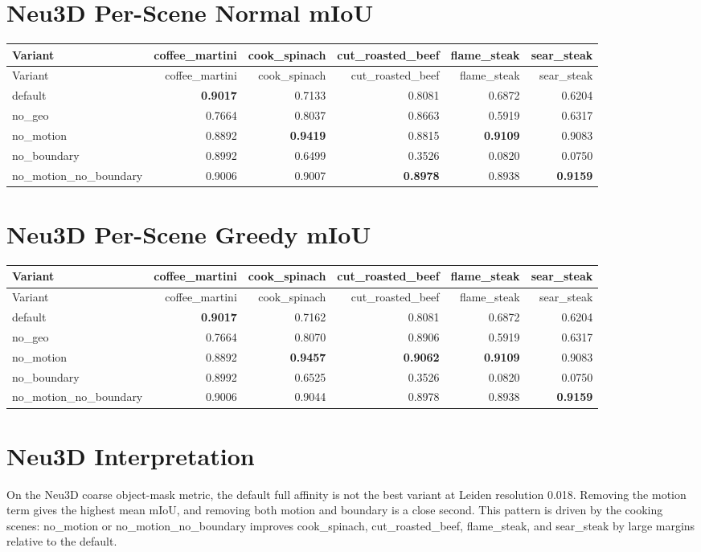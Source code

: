 \documentclass[10pt]{article}
\begin{document}
\section{Neu3D Per-Scene Normal mIoU}
\small
\begin{longtable}{lrrrrr}
\toprule
Variant & coffee\_martini & cook\_spinach & cut\_roasted\_beef & flame\_steak & sear\_steak \\
\midrule
\endfirsthead
\toprule
Variant & coffee\_martini & cook\_spinach & cut\_roasted\_beef & flame\_steak & sear\_steak \\
\midrule
\endhead
default & \textbf{0.9017} & 0.7133 & 0.8081 & 0.6872 & 0.6204 \\
no\_geo & 0.7664 & 0.8037 & 0.8663 & 0.5919 & 0.6317 \\
no\_motion & 0.8892 & \textbf{0.9419} & 0.8815 & \textbf{0.9109} & 0.9083 \\
no\_boundary & 0.8992 & 0.6499 & 0.3526 & 0.0820 & 0.0750 \\
no\_motion\_no\_boundary & 0.9006 & 0.9007 & \textbf{0.8978} & 0.8938 & \textbf{0.9159} \\
\bottomrule
\end{longtable}
\normalsize

\section{Neu3D Per-Scene Greedy mIoU}
\small
\begin{longtable}{lrrrrr}
\toprule
Variant & coffee\_martini & cook\_spinach & cut\_roasted\_beef & flame\_steak & sear\_steak \\
\midrule
\endfirsthead
\toprule
Variant & coffee\_martini & cook\_spinach & cut\_roasted\_beef & flame\_steak & sear\_steak \\
\midrule
\endhead
default & \textbf{0.9017} & 0.7162 & 0.8081 & 0.6872 & 0.6204 \\
no\_geo & 0.7664 & 0.8070 & 0.8906 & 0.5919 & 0.6317 \\
no\_motion & 0.8892 & \textbf{0.9457} & \textbf{0.9062} & \textbf{0.9109} & 0.9083 \\
no\_boundary & 0.8992 & 0.6525 & 0.3526 & 0.0820 & 0.0750 \\
no\_motion\_no\_boundary & 0.9006 & 0.9044 & 0.8978 & 0.8938 & \textbf{0.9159} \\
\bottomrule
\end{longtable}
\normalsize

\section{Neu3D Interpretation}
On the Neu3D coarse object-mask metric, the default full affinity is not the best variant at Leiden resolution 0.018.  Removing the motion term gives the highest mean mIoU, and removing both motion and boundary is a close second.  This pattern is driven by the cooking scenes: no\_motion or no\_motion\_no\_boundary improves cook\_spinach, cut\_roasted\_beef, flame\_steak, and sear\_steak by large margins relative to the default.
\end{document}
